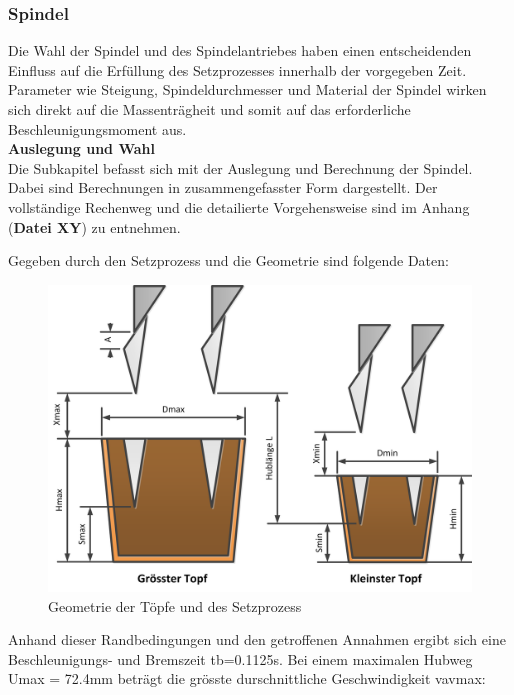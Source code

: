 \subsubsection{Spindel}
Die Wahl der Spindel und des Spindelantriebes haben einen entscheidenden Einfluss auf die Erfüllung des Setzprozesses innerhalb der vorgegeben Zeit. Parameter wie Steigung, Spindeldurchmesser und Material der Spindel wirken sich direkt auf die Massenträgheit und somit auf das erforderliche Beschleunigungsmoment aus.
 \\
 \newline
\textbf{Auslegung und Wahl}
 \\
Die Subkapitel befasst sich mit der Auslegung und Berechnung der Spindel. Dabei sind Berechnungen in zusammengefasster Form dargestellt. Der vollständige Rechenweg und die detailierte Vorgehensweise sind im Anhang (\textbf{Datei XY}) zu entnehmen.

Gegeben durch den Setzprozess und die Geometrie sind folgende Daten:
	\begin{figure}[H]
	\includegraphics[width=1\textwidth]{Illustrationen/6-Umsetzung/topfgeometrie.png}
	\caption{Geometrie der Töpfe und des Setzprozess}
	\label{fig:topfgeometrie}
	\end{figure}
Anhand dieser Randbedingungen und den getroffenen Annahmen ergibt sich eine Beschleunigungs- und Bremszeit tb=0.1125s. Bei einem maximalen Hubweg Umax = 72.4mm beträgt die grösste durschnittliche Geschwindigkeit vavmax:

